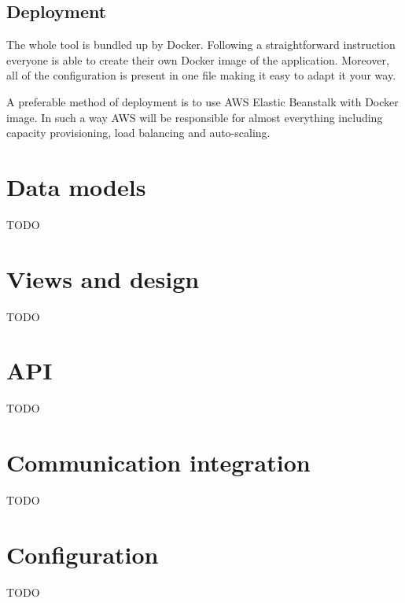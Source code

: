 \documentclass[licencjacka,en]{thesisclass}
\begin{document}
    \subsection{Deployment}

    The whole tool is bundled up by Docker.
    Following a straightforward instruction everyone is able to create their own Docker image of the application.
    Moreover, all of the configuration is present in one file making it easy to adapt it your way.

    A preferable method of deployment is to use AWS Elastic Beanstalk with Docker image.
    In such a way AWS will be responsible for almost everything including capacity provisioning, load balancing and auto-scaling.

    \section{Data models}
    TODO
    \section{Views and design}
    TODO
    \section{API}
    TODO
    \section{Communication integration}
    TODO
    \section{Configuration}
    TODO
\end{document}
